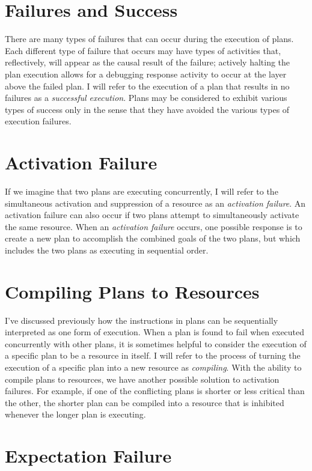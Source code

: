 \section{Failures and Success}

There are many types of failures that can occur during the execution
of plans.  Each different type of failure that occurs may have types
of activities that, reflectively, will appear as the causal result of
the failure; actively halting the plan execution allows for a
debugging response activity to occur at the layer above the failed
plan.  I will refer to the execution of a plan that results in no
failures as a \emph{successful execution}.  Plans may be considered to
exhibit various types of success only in the sense that they have
avoided the various types of execution failures.

\section{Activation Failure}

If we imagine that two plans are executing concurrently, I will refer
to the simultaneous activation and suppression of a resource as an
\emph{activation failure}.  An activation failure can also occur if
two plans attempt to simultaneously activate the same resource.  When
an \emph{activation failure} occurs, one possible response is to
create a new plan to accomplish the combined goals of the two plans,
but which includes the two plans as executing in sequential order.

\section{Compiling Plans to Resources}

I've discussed previously how the instructions in plans can be
sequentially interpreted as one form of execution.  When a plan is
found to fail when executed concurrently with other plans, it is
sometimes helpful to consider the execution of a specific plan to be a
resource in itself.  I will refer to the process of turning the
execution of a specific plan into a new resource as \emph{compiling}.
With the ability to compile plans to resources, we have another
possible solution to activation failures.  For example, if one of the
conflicting plans is shorter or less critical than the other, the
shorter plan can be compiled into a resource that is inhibited
whenever the longer plan is executing.

\section{Expectation Failure}

